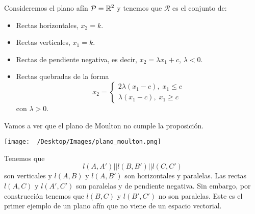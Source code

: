 \begin{eg}
Consideremos el plano afín $\displaystyle \mathcal{P} = \mathbb{R}^{2} $ y tenemos que $\displaystyle \mathcal{R} $ es el conjunto de:
\begin{itemize}
\item Rectas horizontales, $\displaystyle x_{2} = k $.
\item Rectas verticales, $\displaystyle x_{1} = k $.
\item Rectas de pendiente negativa, es decir, $\displaystyle x_{2} = \lambda x_{1} + c $, $\displaystyle \lambda < 0 $.
\item Rectas quebradas de la forma 
	\[ x_{2} = 
	\begin{cases}
	2\lambda\left(x_{1}-c\right), \; x_{1} \leq c \\
	\lambda\left(x_{1}-c\right), \; x_{1} \geq c
	\end{cases}
	\]
	con $\displaystyle \lambda > 0 $.
\end{itemize}
Vamos a ver que el plano de Moulton no cumple la proposición. 
\begin{center}
	\texttt{[image: ~/Desktop/Images/plano\_moulton.png]}
\end{center}
Tenemos que  
\[ l\left(A,A'\right) | | l\left(B,B'\right) | | l\left(C,C'\right)\]
son verticales y $\displaystyle l\left(A,B\right) $ y $\displaystyle l\left(A,B'\right) $ son horizontales y paralelas. Las rectas $\displaystyle l\left(A,C\right) $ y $l\left(A',C'\right) $ son paralelas y de pendiente negativa. Sin embargo, por construcción tenemos que $\displaystyle l\left(B,C\right) $ y $\displaystyle l\left(B',C'\right) $ no son paralelas. Este es el primer ejemplo de un plano afín que no viene de un espacio vectorial. 
\end{eg}


